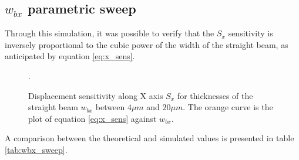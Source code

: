 \documentclass[lettersize,journal]{IEEEtran}
\begin{document}
    \newpage
    \subsection{\(w_{bx}\) parametric sweep}
    Through this simulation, it was possible to verify that the \(S_x\) sensitivity is inversely proportional to the cubic power of the width of the straight beam, as anticipated by equation \ref{eq:x_sens}.
    
    \begin{figure}[!h]
        \centering
        
        \caption{Displacement sensitivity along X axis \(S_x\) for thicknesses of the straight beam \(w_{bx}\) between \(4 \mu m\) and \(20\mu m\). The orange curve is the plot of equation \ref{eq:x_sens} against \(w_{bx}\).}.
        \label{plt:wbx_sweep}
    \end{figure}
    
    
    A comparison between the theoretical and simulated values is presented in table \ref{tab:wbx_sweep}.
    
\end{document}
